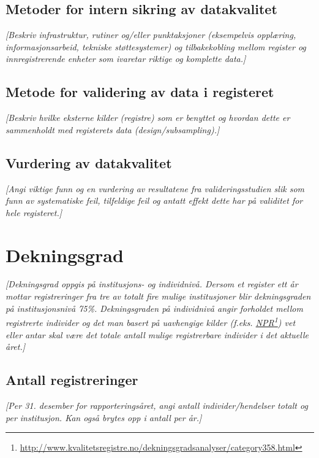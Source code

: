 \documentclass[norsk, a4paper, twocolumn]{report}
\newcommand{\guide}[1] {
	\textit{[\textcolor{guidegray}{#1}]}
	}
\begin{document}
\section{Metoder for intern sikring av datakvalitet}\label{sec:sik}
\guide{Beskriv infrastruktur, rutiner og/eller punktaksjoner (eksempelvis
opplæring, informasjonsarbeid, tekniske støttesystemer) og tilbakekobling mellom register og innregistrerende enheter som ivaretar riktige og
komplette data.}

\section{Metode for validering av data i registeret}\label{sec:metval}
\guide{Beskriv hvilke eksterne kilder (registre) som er benyttet og hvordan
dette er sammenholdt med registerets data (design/subsampling).} 

\section{Vurdering av datakvalitet}\label{sec:valdat}
\guide{Angi viktige funn og en vurdering av resultatene fra
valideringsstudien slik som funn av systematiske feil, tilfeldige feil og
antatt effekt dette har på validitet for hele registeret.}




\chapter{Dekningsgrad}\label{cha:dek}
\guide{Dekningsgrad oppgis på institusjons- og individnivå. Dersom
et register ett år mottar registreringer fra tre
av totalt fire mulige institusjoner blir dekningsgraden på
institusjonsnivå 75\%. Dekningsgraden på individnivå angir
forholdet mellom registrerte individer og det man basert på uavhengige
kilder (f.eks.
\href{http://www.kvalitetsregistre.no/dekningsgradsanalyser/category358.html}
{NPR}\footnote{\url{http://www.kvalitetsregistre.no/dekningsgradsanalyser/category358.html}})
vet eller antar skal være det totale antall mulige registrerbare
individer i det aktuelle året.}

\section{Antall registreringer}\label{sec:reg}
\guide{Per 31. desember for rapporteringsåret, angi antall
individer/hendelser totalt og per institusjon. Kan også brytes opp i antall per år.}
\end{document}
